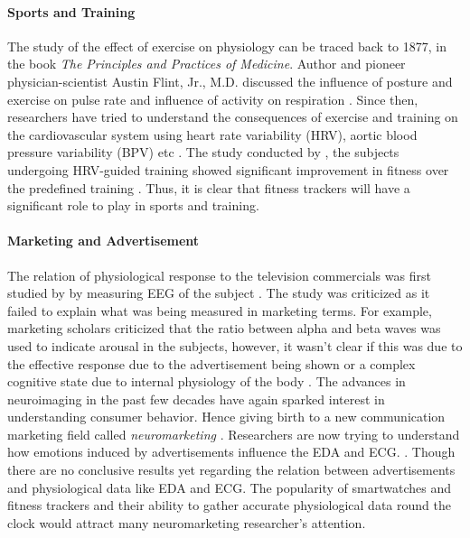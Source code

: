 \paragraph{Sports and Training} The study of the effect of exercise on physiology can be traced back to 1877, in the book \textit{The Principles and Practices of Medicine}. Author and pioneer physician-scientist Austin Flint, Jr., M.D. discussed the influence of posture and exercise on pulse rate and influence of activity on respiration \cite{mcardle_essentials_2006}. Since then, researchers have tried to understand the consequences of exercise and training on the cardiovascular system using heart rate variability (HRV), aortic blood pressure variability (BPV) etc \cite{aubert_heart_2003}. The study conducted by \citeauthor{vesterinen_individual_2016}, the subjects undergoing HRV-guided training showed significant improvement in fitness over the predefined training \cite{vesterinen_individual_2016}. Thus, it is clear that fitness trackers will have a significant role to play in sports and training.

\paragraph{Marketing and Advertisement} The relation of physiological response to the television commercials was first studied by \citeauthor{522761019710201} by measuring EEG of the subject \cite{522761019710201}. The study was criticized as it failed to explain what was being measured in marketing terms. For example, marketing scholars criticized that the ratio between alpha and beta waves was used to indicate arousal in the subjects, however, it wasn't clear if this was due to the effective response due to the advertisement being shown or a complex cognitive state due to internal physiology of the body \cite{1907543419840330}. The advances in neuroimaging in the past few decades have again sparked interest in understanding consumer behavior. Hence giving birth to a new communication marketing field called \textit{neuromarketing} \cite{ait_hammou_contributions_2013}. Researchers are now trying to understand how emotions induced by advertisements influence the EDA and ECG. \cite{baraybar-fernandez_evaluation_2017}. Though there are no conclusive results yet regarding the relation between advertisements and physiological data like EDA and ECG. The popularity of smartwatches and fitness trackers and their ability to gather accurate physiological data round the clock would attract many neuromarketing researcher's attention.


